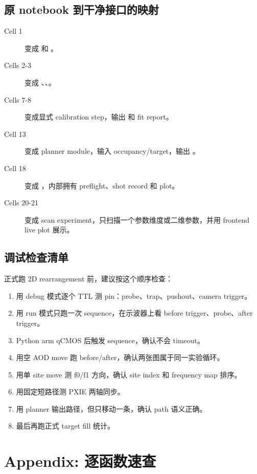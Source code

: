 \documentclass[11pt,oneside,openany]{book}
\begin{document}
\section{原 notebook 到干净接口的映射}
\begin{description}
  \item[Cell 1] 变成  和 。
  \item[Cells 2-3] 变成 、、。
  \item[Cells 7-8] 变成显式 calibration step，输出  和 fit report。
  \item[Cell 13] 变成 planner module，输入 occupancy/target，输出 。
  \item[Cell 18] 变成 ，内部拥有 preflight、shot record 和 plot。
  \item[Cells 20-21] 变成 scan experiment，只扫描一个参数维度或二维参数，并用 frontend live plot 展示。
\end{description}

\section{调试检查清单}
正式跑 2D rearrangement 前，建议按这个顺序检查：
\begin{enumerate}
  \item 用 debug 模式逐个 TTL 测 pin：probe、trap、pushout、camera trigger。
  \item 用 run 模式只跑一次 sequence，在示波器上看 before trigger、probe、after trigger。
  \item Python arm qCMOS 后触发 sequence，确认不会 timeout。
  \item 用空 AOD move 跑 before/after，确认两张图属于同一实验循环。
  \item 用单 site move 测 f0/f1 方向，确认 site index 和 frequency map 排序。
  \item 用固定短路径测 PXIE 两轴同步。
  \item 用 planner 输出路径，但只移动一条，确认 path 语义正确。
  \item 最后再跑正式 target fill 统计。
\end{enumerate}

\chapter{Appendix: 逐函数速查}
\end{document}
